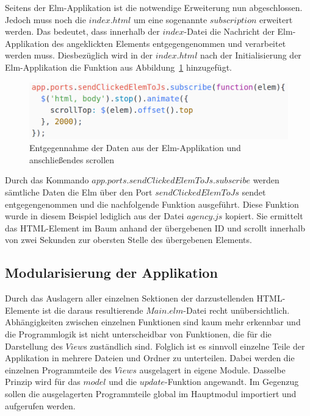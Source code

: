Seitens der Elm-Applikation ist die notwendige Erweiterung nun abgeschlossen. Jedoch muss noch die $index.html$ um eine sogenannte $subscription$ erweitert werden. Das bedeutet, dass innerhalb der $index$-Datei die Nachricht der Elm-Applikation des angeklickten Elements entgegengenommen und verarbeitet werden muss. Diesbezüglich wird in der $index.html$ nach der Initialisierung der Elm-Applikation die Funktion aus Abbildung~\ref{fig:scrollTop} hinzugefügt.
\begin{figure}[hbt]
\centering
\includegraphics[scale=0.4]{img/scrollTop.png}
\caption{Entgegennahme der Daten aus der Elm-Applikation und anschließendes scrollen}\label{fig:scrollTop}
\end{figure}
Durch das Kommando $app.ports.sendClickedElemToJs.subscribe$ werden sämtliche Daten die Elm über den Port $sendClickedElemToJs$ sendet entgegengenommen und die nachfolgende Funktion ausgeführt. Diese Funktion wurde in diesem Beispiel lediglich aus der Datei $agency.js$ kopiert. Sie ermittelt das \ac{HTML}-Element im Baum anhand der übergebenen \ac{ID} und scrollt innerhalb von zwei Sekunden zur obersten Stelle des übergebenen Elements.

\subsection{Modularisierung der Applikation}
\label{sec:modularisierung-der-applikation}
Durch das Auslagern aller einzelnen Sektionen der darzustellenden \ac{HTML}-Elemente ist die daraus resultierende $Main.elm$-Datei recht unübersichtlich. Abhängigkeiten zwischen einzelnen Funktionen sind kaum mehr erkennbar und die Programmlogik ist nicht unterscheidbar von Funktionen, die für die Darstellung des $View$s zuständlich sind. Folglich ist es sinnvoll einzelne Teile der Applikation in mehrere Dateien und Ordner zu unterteilen. Dabei werden die einzelnen Programmteile des $Views$ ausgelagert in eigene Module. Dasselbe Prinzip wird für das $model$ und die $update$-Funktion angewandt. Im Gegenzug sollen die ausgelagerten Programmteile global im Hauptmodul importiert und aufgerufen werden.

